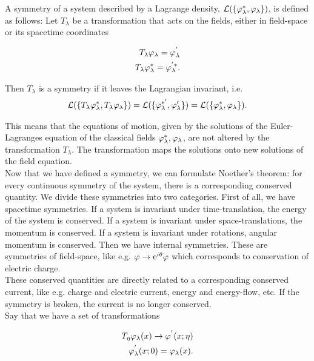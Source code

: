 A symmetry of a system described by a Lagrange density, $\mathcal{L}(\{\varphi_\lambda^*, \varphi_\lambda\})$, is defined as follows: Let $T_\lambda$ be a transformation that acts on the fields, either in field-space or its spacetime coordinates

\begin{align*}
    T_\lambda \varphi_\lambda = \varphi_\lambda^{'} \\ 
    T_\lambda \varphi_\lambda^* = \varphi_\lambda^{'*}. 
\end{align*}

Then $T_\lambda$ is a symmetry if it leaves the Lagrangian invariant, i.e. \\ 

\begin{align*}
    \mathcal{L}(\{T_\lambda \varphi_\lambda^*, T_\lambda \varphi_\lambda\}) = \mathcal{L}(\{\varphi_\lambda^{*'}, \varphi_\lambda'\}) = \mathcal{L}(\{\varphi_\lambda^*, \varphi_\lambda\}).
\end{align*}

This means that the equations of motion, given by the solutions of the Euler-Lagranges equation of the classical fields $\varphi_\lambda^*, \varphi_\lambda$, are not altered by the transformation $T_\lambda$. The transformation maps the solutions onto new solutions of the field equation. \\ 

Now that we have defined a symmetry, we can formulate Noether's theorem: for every continuous symmetry of the system, there is a corresponding conserved quantity. We divide these symmetries into two categories. First of all, we have spacetime symmetries. If a system is invariant under time-translation, the energy of the system is conserved. If a system is invariant under space-translations, the momentum is conserved. If a system is invariant under rotations, angular momentum is conserved. Then we have internal symmetries. These are symmetries of field-space, like e.g. $\varphi \to \mathrm{e}^{i\theta}\varphi$ which corresponds to conservation of electric charge. \\ 

These conserved quantities are directly related to a corresponding conserved current, like e.g. charge and electric current, energy and energy-flow, etc. If the symmetry is broken, the current is no longer conserved. \\ 

Say that we have a set of transformations 

\begin{align*}
    T_\eta \varphi_\lambda (x) \to \varphi^{'} (x; \eta) \\
    \varphi_\lambda^{'} (x; 0) = \varphi_\lambda (x). 
\end{align*}

